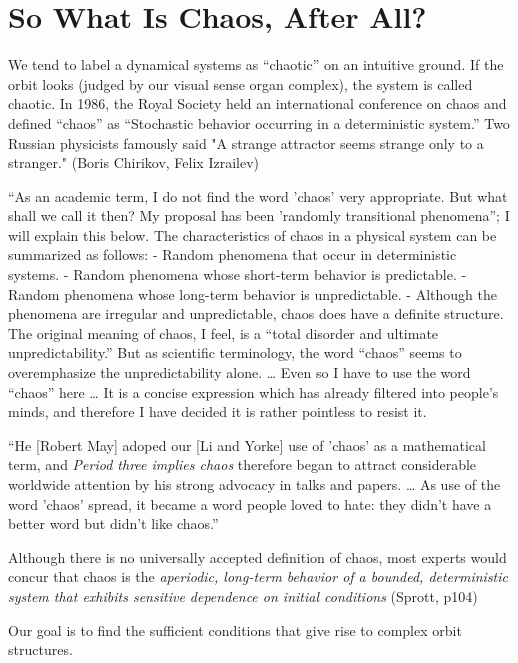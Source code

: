 \documentclass[12pt,twoside]{book}
\begin{document}
\section{So What Is Chaos, After All?}
We tend to label a dynamical systems as ``chaotic'' on an intuitive ground.
If the orbit looks (judged by our visual sense organ complex), the system is called chaotic.
In 1986, the Royal Society held an international conference on chaos and defined ``chaos'' as ``Stochastic behavior occurring in a deterministic system.'' \cite{stewart}
Two Russian physicists famously said "A strange attractor seems strange only to a stranger."
(Boris Chirikov, Felix Izrailev)\cite{lorentzbook}

``As an academic term, I do not find the word 'chaos' very appropriate.
But what shall we call it then?
My proposal has been 'randomly transitional phenomena''; I will explain this below.
The characteristics of chaos in a physical system can be summarized as follows:
- Random phenomena that occur in deterministic systems.
- Random phenomena whose short-term behavior is predictable.
- Random phenomena whose long-term behavior is unpredictable.
- Although the phenomena are irregular and unpredictable, chaos does have a definite structure.
The original meaning of chaos, I feel, is a ``total disorder and ultimate unpredictability.''
But as scientific terminology, the word ``chaos'' seems to overemphasize the unpredictability alone.
\ldots
Even so I have to use the word ``chaos'' here \ldots
It is a concise expression which has already filtered into people's minds, and therefore I have decided it is rather pointless to resist it.
\citep[24]{ueda-abraham}

``He [Robert May] adoped our [Li and Yorke] use of 'chaos' as a mathematical term, and \textit{Period three implies chaos} therefore began to attract considerable worldwide attention by his strong advocacy in talks and papers.
\ldots
As use of the word 'chaos' spread, it became a word people loved to hate: they didn't have a better word but didn't like chaos.''
\citep[205]{ueda-abraham}

Although there is no universally accepted definition of chaos, most experts would concur that chaos is the {\it aperiodic, long-term behavior of a bounded, deterministic system that exhibits sensitive dependence on initial conditions} (Sprott, p104)

Our goal is to find the sufficient conditions that give rise to complex orbit structures.
\end{document}
